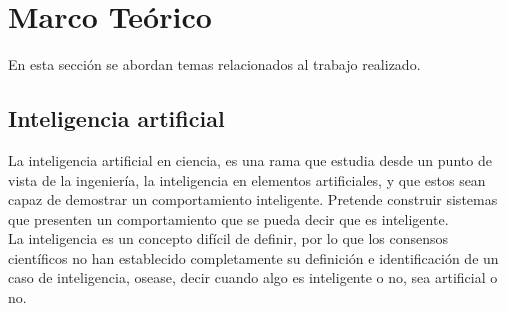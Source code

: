 \documentclass[twoside,spanish,ESP,MSc]{plantillaLabUPV}
\theoremstyle{definition}
\begin{document}
 


\chapter{Marco Teórico} \label{chap:marcoteori} 

En esta sección se abordan temas relacionados al trabajo realizado.




\section{Inteligencia artificial}

La inteligencia artificial en ciencia, es una rama que estudia desde un punto de vista de la ingeniería, la inteligencia en elementos artificiales, y que estos sean capaz de demostrar un comportamiento inteligente. Pretende construir sistemas que presenten un comportamiento que se pueda decir que es inteligente.\\


La inteligencia es un concepto difícil de definir, por lo que los consensos científicos no han establecido completamente su definición e identificación de un caso de inteligencia, osease, decir cuando algo es inteligente o no, sea artificial o no.\\
\end{document}

